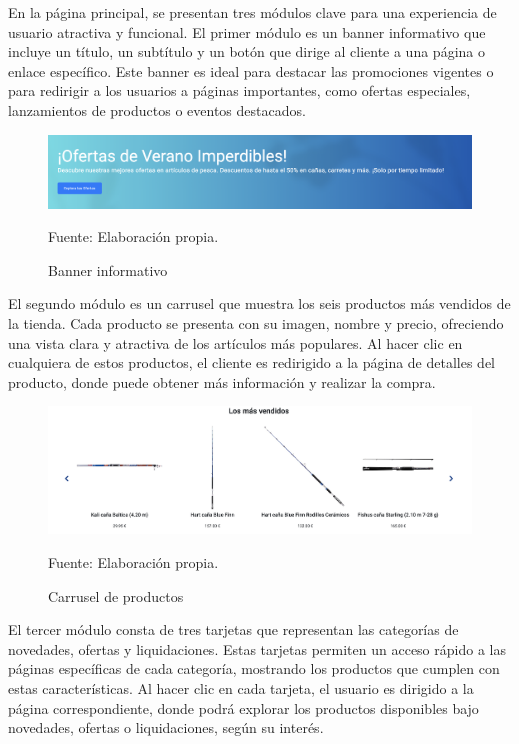 En la página principal, se presentan tres módulos clave para una experiencia de usuario atractiva y funcional. El primer módulo es un banner informativo que incluye un título, un subtítulo y un botón que dirige al cliente a una página o enlace específico. Este banner es ideal para destacar las promociones vigentes o para redirigir a los usuarios a páginas importantes, como ofertas especiales, lanzamientos de productos o eventos destacados.

\begin{figure}[H]
\begin{center}
\includegraphics[scale=0.4]{./Images/vistaBanner.png}
\caption{Banner informativo} Fuente: Elaboración propia.

\label{fig:fig1}

\end{center}
\end{figure}

El segundo módulo es un carrusel que muestra los seis productos más vendidos de la tienda. Cada producto se presenta con su imagen, nombre y precio, ofreciendo una vista clara y atractiva de los artículos más populares. Al hacer clic en cualquiera de estos productos, el cliente es redirigido a la página de detalles del producto, donde puede obtener más información y realizar la compra.

\begin{figure}[H]
\begin{center}
\includegraphics[scale=0.35]{./Images/vistaCarrusel.png}
\caption{Carrusel de productos} Fuente: Elaboración propia.

\label{fig:fig1}

\end{center}
\end{figure}

El tercer módulo consta de tres tarjetas que representan las categorías de novedades, ofertas y liquidaciones. Estas tarjetas permiten un acceso rápido a las páginas específicas de cada categoría, mostrando los productos que cumplen con estas características. Al hacer clic en cada tarjeta, el usuario es dirigido a la página correspondiente, donde podrá explorar los productos disponibles bajo novedades, ofertas o liquidaciones, según su interés.

